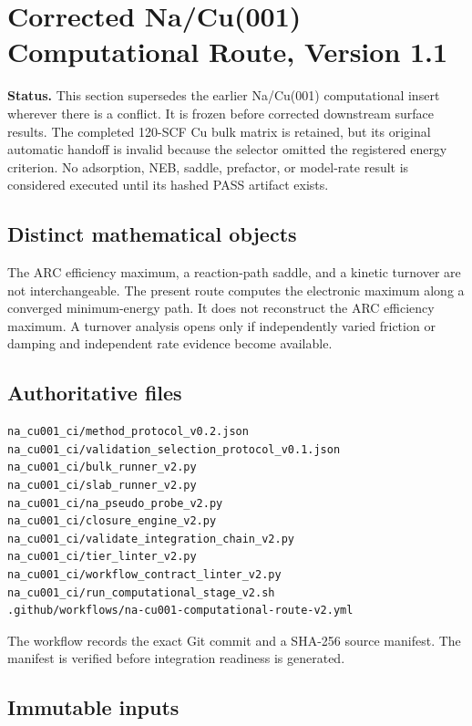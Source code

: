\section*{Corrected Na/Cu(001) Computational Route, Version 1.1}

\noindent\textbf{Status.}
This section supersedes the earlier Na/Cu(001) computational insert wherever
there is a conflict.  It is frozen before corrected downstream surface results.
The completed 120-SCF Cu bulk matrix is retained, but its original automatic
handoff is invalid because the selector omitted the registered energy criterion.
No adsorption, NEB, saddle, prefactor, or model-rate result is considered
executed until its hashed PASS artifact exists.

\subsection*{Distinct mathematical objects}

The ARC efficiency maximum, a reaction-path saddle, and a kinetic turnover are
not interchangeable.  The present route computes the electronic maximum along
a converged minimum-energy path.  It does not reconstruct the ARC efficiency
maximum.  A turnover analysis opens only if independently varied friction or
damping and independent rate evidence become available.

\subsection*{Authoritative files}

\begin{verbatim}
na_cu001_ci/method_protocol_v0.2.json
na_cu001_ci/validation_selection_protocol_v0.1.json
na_cu001_ci/bulk_runner_v2.py
na_cu001_ci/slab_runner_v2.py
na_cu001_ci/na_pseudo_probe_v2.py
na_cu001_ci/closure_engine_v2.py
na_cu001_ci/validate_integration_chain_v2.py
na_cu001_ci/tier_linter_v2.py
na_cu001_ci/workflow_contract_linter_v2.py
na_cu001_ci/run_computational_stage_v2.sh
.github/workflows/na-cu001-computational-route-v2.yml
\end{verbatim}

The workflow records the exact Git commit and a SHA-256 source manifest.  The
manifest is verified before integration readiness is generated.

\subsection*{Immutable inputs}

